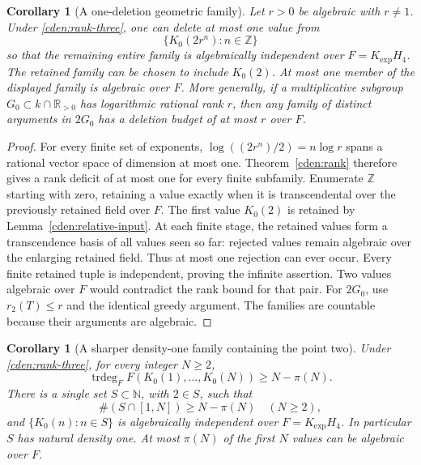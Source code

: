 \documentclass[11pt]{article}
\newtheorem{corollary}[theorem]{Corollary}
\theoremstyle{definition}
\theoremstyle{remark}
\begin{document}
\begin{corollary}[A one-deletion geometric family]
\label{cden:geometric}
Let $r>0$ be algebraic with $r\ne1$. Under
\eqref{cden:rank-three}, one can delete at most one value from
\[
                   \{K_0(2r^n):n\in\mathbb Z\}
\]
so that the remaining entire family is algebraically independent
over $F=K_{\exp}H_4$. The retained family can be chosen to include
$K_0(2)$. At most one member of the displayed family is algebraic
over $F$.
More generally, if a multiplicative subgroup
$G_0\subset k\cap\mathbb R_{>0}$ has logarithmic rational rank $r$,
then any family of distinct arguments in $2G_0$ has a deletion budget
of at most $r$ over $F$.
\end{corollary}

\begin{proof}
For every finite set of exponents,
$\log((2r^n)/2)=n\log r$ spans a rational vector space of dimension
at most one. Theorem~\ref{cden:rank} therefore gives a rank deficit
of at most one for every finite subfamily. Enumerate $\mathbb Z$
starting with zero, retaining a value exactly when it is
transcendental over the previously retained field over $F$.
The first value $K_0(2)$ is retained by
Lemma~\ref{cden:relative-input}. At each finite stage, the retained
values form a transcendence basis of all values seen so far:
rejected values remain algebraic over the enlarging retained field.
Thus at most one rejection can ever occur. Every finite retained
tuple is independent, proving the infinite assertion. Two values
algebraic over $F$ would contradict the rank bound for that pair.
For $2G_0$, use $r_2(T)\le r$ and the identical greedy argument.
The families are countable because their arguments are algebraic.
\end{proof}

\begin{corollary}[A sharper density-one family containing the point two]
\label{cden:density}
Under \eqref{cden:rank-three}, for every integer $N\ge2$,
\begin{equation}\label{cden:integer-bound}
 \operatorname{trdeg}_F F(K_0(1),\ldots,K_0(N))
                       \ge N-\pi(N).
\end{equation}
There is a single set $S\subset\mathbb N$, with $2\in S$, such that
\[
 \#(S\cap[1,N])\ge N-\pi(N)\quad(N\ge2),
\]
and $\{K_0(n):n\in S\}$ is algebraically independent over
$F=K_{\exp}H_4$. In particular $S$ has natural density one.
At most $\pi(N)$ of the first $N$ values can be algebraic over $F$.
\end{corollary}
\end{document}
